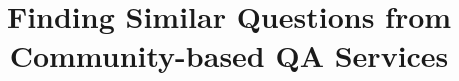 \documentclass{acm_proc_article-sp}
\begin{document}
\title{Finding Similar Questions from Community-based QA Services}
%
%
%
%
%
\end{document}

